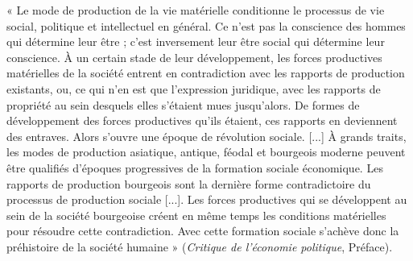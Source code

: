 \vspace{0.5cm}

{\footnotesize « Le mode de production de la vie matérielle conditionne le processus de vie social,
politique et intellectuel en général. Ce n’est pas la conscience des hommes qui détermine
leur être ; c’est inversement leur être social qui détermine leur conscience. À un
certain stade de leur développement, les forces productives matérielles de la société
entrent en contradiction avec les rapports de production existants, ou, ce qui n’en est
que l’expression juridique, avec les rapports de propriété au sein desquels elles s'étaient
mues jusqu'alors. De formes de développement des forces productives qu’ils étaient, ces
rapports en deviennent des entraves. Alors s'ouvre une époque de révolution sociale.
[...] À grands traits, les modes de production asiatique, antique, féodal et bourgeois
moderne peuvent être qualifiés d’époques progressives de la formation sociale économique.
Les rapports de production bourgeois sont la dernière forme contradictoire du
processus de production sociale [...]. Les forces productives qui se développent au sein
de la société bourgeoise créent en même temps les conditions matérielles pour résoudre
cette contradiction. Avec cette formation sociale s’achève donc la préhistoire de la
société humaine » ({\it Critique de l'économie politique}, Préface).
}

\vspace{0.5cm}

